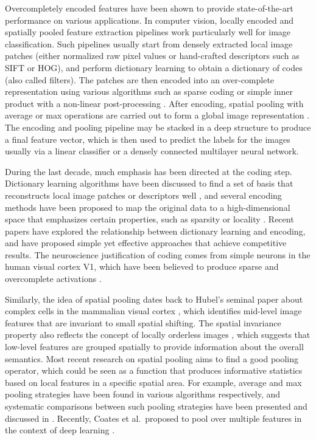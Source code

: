 Overcompletely encoded features have been shown to provide state-of-the-art performance on various applications. In computer vision, locally encoded and spatially pooled feature extraction pipelines work particularly well for image classification. Such pipelines usually start from densely extracted local image patches (either normalized raw pixel values or hand-crafted descriptors such as SIFT or HOG), and perform dictionary learning to obtain a dictionary of codes (also called filters). The patches are then encoded into an over-complete representation using various algorithms such as sparse coding \cite{Olshausen:1997uh,wang2010locality} or simple inner product with a non-linear post-processing \cite{coates2011icml,krizhevsky2012imagenet}. After encoding, spatial pooling with average or max operations are carried out to form a global image representation \cite{Yang:2009vb,Boureau:uq}. The encoding and pooling pipeline may be stacked in a deep structure to produce a final feature vector, which is then used to predict the labels for the images usually via a linear classifier or a densely connected multilayer neural network.

During the last decade, much emphasis has been directed at the coding step. Dictionary learning algorithms have been discussed to find a set of basis that reconstructs local image patches or descriptors well \cite{mairal2010online,Coates:2011ud}, and several encoding methods have been proposed to map the original data to a high-dimensional space that emphasizes certain properties, such as sparsity \cite{Olshausen:1997uh,Yang:2009vb,yang2010efficient} or locality \cite{Wang:2010um}. Recent papers \cite{Coates:wo, Rigamonti:2011uc, Coates:2011ud} have explored the relationship between dictionary learning and encoding, and have proposed simple yet effective approaches that achieve competitive results. The neuroscience justification of coding comes from simple neurons in the human visual cortex V1, which have been believed to produce sparse and overcomplete activations \cite{Olshausen:1997uh}.

Similarly, the idea of spatial pooling dates back to Hubel's seminal paper about complex cells in the mammalian visual cortex \cite{Hubel:1962vm}, which identifies mid-level image features that are invariant to small spatial shifting. The spatial invariance property also reflects the concept of locally orderless images \cite{Koenderink:1999bh}, which suggests that low-level features are grouped spatially to provide information about the overall semantics. Most recent research on spatial pooling aims to find a good pooling operator, which could be seen as a function that produces informative statistics based on local features in a specific spatial area. For example, average and max pooling strategies have been found in various algorithms respectively, and systematic comparisons between such pooling strategies have been presented and discussed in \cite{Boureau:uq,Boureau:2010wz}. Recently, Coates et al.\ proposed to pool over multiple features in the context of deep learning \cite{coates2011selecting}.

